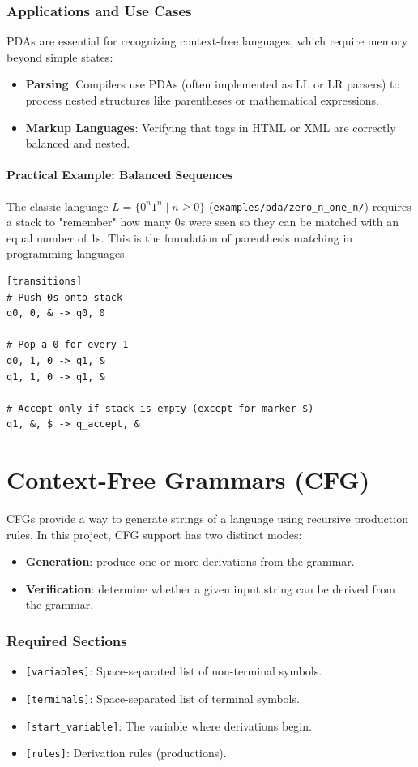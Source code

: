 \documentclass{article}
\begin{document}
\subsubsection{Applications and Use Cases}
PDAs are essential for recognizing context-free languages, which require memory beyond simple states:
\begin{itemize}
    \item \textbf{Parsing}: Compilers use PDAs (often implemented as LL or LR parsers) to process nested structures like parentheses or mathematical expressions.
    \item \textbf{Markup Languages}: Verifying that tags in HTML or XML are correctly balanced and nested.
\end{itemize}

\paragraph{Practical Example: Balanced Sequences}
The classic language $L = \{0^n 1^n \mid n \ge 0\}$ (\texttt{examples/pda/zero\_n\_one\_n/}) requires a stack to "remember" how many 0s were seen so they can be matched with an equal number of 1s. This is the foundation of parenthesis matching in programming languages.
\begin{lstlisting}[caption={PDA for matching balanced 0s and 1s}]
[transitions]
# Push 0s onto stack
q0, 0, & -> q0, 0

# Pop a 0 for every 1
q0, 1, 0 -> q1, &
q1, 1, 0 -> q1, &

# Accept only if stack is empty (except for marker $)
q1, &, $ -> q_accept, &
\end{lstlisting}

\clearpage
\section{Context-Free Grammars (CFG)}
CFGs provide a way to generate strings of a language using recursive production rules. In this project, CFG support has two distinct modes:
\begin{itemize}
    \item \textbf{Generation}: produce one or more derivations from the grammar.
    \item \textbf{Verification}: determine whether a given input string can be derived from the grammar.
\end{itemize}

\subsubsection{Required Sections}
\begin{itemize}
    \item \texttt{[variables]}: Space-separated list of non-terminal symbols.
    \item \texttt{[terminals]}: Space-separated list of terminal symbols.
    \item \texttt{[start\_variable]}: The variable where derivations begin.
    \item \texttt{[rules]}: Derivation rules (productions).
\end{itemize}
\end{document}
